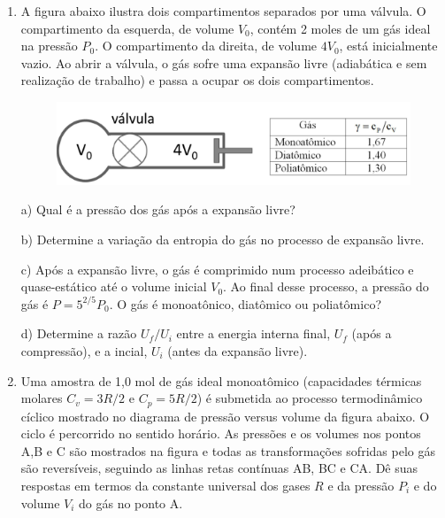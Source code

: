 \begin{enumerate}[start=1,label={\bfseries Q\arabic*.}]
{}




\item A figura abaixo ilustra dois compartimentos separados por uma válvula. O compartimento da esquerda, de volume $V_{0}$, contém 2 moles de um gás ideal na pressão $P_{0}$. O compartimento da direita, de volume $4V_{0}$, está inicialmente vazio. Ao abrir a válvula, o gás sofre uma expansão livre (adiabática e sem realização de trabalho) e passa a ocupar os dois compartimentos.

\begin{figure}[H]
  \centering
  \includegraphics[scale=0.5]{termica-img/tubo.png}
\end{figure}


  a) Qual é a pressão dos gás após a expansão livre?

  \resposta

  b) Determine a variação da entropia do gás no processo de expansão livre.

  \resposta

  c) Após a expansão livre, o gás é comprimido num processo adeibático e quase-estático até o volume inicial $V_{0}$. Ao final desse processo, a pressão do gás é $P = 5^{2/5} P_{0}$. O gás é monoatônico, diatômico ou poliatômico?

  \resposta

  d) Determine a razão $U_{f}/ U_{i}$ entre a energia interna final, $U_{f}$ (após a compressão), e a incial, $U_{i}$ (antes da expansão livre).





\item Uma amostra de 1,0 mol de gás ideal monoatômico (capacidades térmicas molares $C_{v} = 3R/2$ e $C_{p} = 5R/2$) é submetida ao processo termodinâmico cíclico mostrado no diagrama de pressão versus volume da figura abaixo. O ciclo é percorrido no sentido horário. As pressões e os volumes nos pontos A,B e C são mostrados na figura e todas as transformações sofridas pelo gás são reversíveis, seguindo as linhas retas contínuas AB, BC e CA. Dê suas respostas em termos da constante universal dos gases $R$ e da pressão $P_{i}$ e do volume $V_{i}$ do gás no ponto A.


\end{enumerate}
